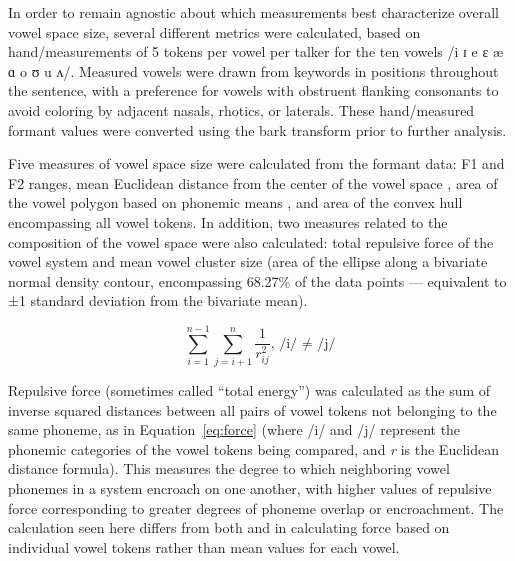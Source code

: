 In order to remain agnostic about which measurements best characterize overall vowel space size, several different metrics were calculated, based on hand\-/measurements of 5 tokens per vowel per talker for the ten vowels /i ɪ e ɛ æ ɑ o ʊ u ʌ/.  Measured vowels were drawn from keywords in positions throughout the sentence, with a preference for vowels with obstruent flanking consonants to avoid coloring by adjacent nasals, rhotics, or laterals.  These hand\-/measured formant values were converted using the bark transform \citep{bark} prior to further analysis.

Five measures of vowel space size were calculated from the formant data: F1 and F2 ranges, mean Euclidean distance from the center of the vowel space \citep[cf.][]{BradlowEtAl1996}, area of the vowel polygon based on phonemic means \citep[cf.][]{BradlowEtAl1996, Neel2008}, and area of the convex hull encompassing all vowel tokens.  In addition, two measures related to the composition of the vowel space were also calculated: total repulsive force of the vowel system \citep[cf.][]{LiljencrantsLindblom1972, Wright2004a} and mean vowel cluster size (area of the ellipse along a bivariate normal density contour, encompassing 68.27\% of the data points — equivalent to ±1 standard deviation from the bivariate mean).  

\begin{equation}\label{eq:force}
	\sum_{i=1}^{n-1} \sum_{j=i+1}^{n} \frac{1}{r_{ij}^2} \text{, /i/ ≠ /j/}
\end{equation}

Repulsive force (sometimes called “total energy”) was calculated as the sum of inverse squared distances between all pairs of vowel tokens not belonging to the same phoneme, as in Equation~\ref{eq:force} (where /i/ and /j/ represent the phonemic categories of the vowel tokens being compared, and \textit{r} is the Euclidean distance formula).  This measures the degree to which neighboring vowel phonemes in a system encroach on one another, with higher values of repulsive force corresponding to greater degrees of phoneme overlap or encroachment.  The calculation seen here differs from both \citealt{LiljencrantsLindblom1972} and \citealt{Wright2004a} in calculating force based on individual vowel tokens rather than mean values for each vowel.

